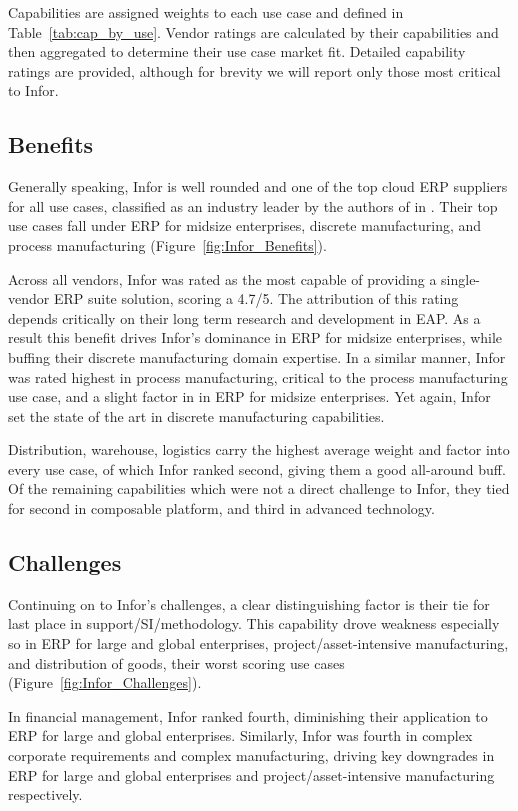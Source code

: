 \documentclass{article}
\begin{document}
Capabilities are assigned weights to each use case and defined in Table~\ref{tab:cap_by_use}.
Vendor ratings are calculated by their capabilities and then aggregated to determine their use case market fit. 
Detailed capability ratings are provided, although for brevity we will report only those most critical to Infor. 

\subsection{Benefits}

Generally speaking, Infor is well rounded and one of the top cloud ERP suppliers for all use cases, classified as an industry leader by the authors of \cite{critical_cloud_erp} in \cite{magic_cloud_erp}.
Their top use cases fall under ERP for midsize enterprises, discrete manufacturing, and process manufacturing (Figure~\ref{fig:Infor_Benefits}).

Across all vendors, Infor was rated as the most capable of providing a single-vendor ERP suite solution, scoring a 4.7/5. 
The attribution of this rating depends critically on their long term research and development in EAP. 
As a result this benefit drives Infor's dominance in ERP for midsize enterprises, while buffing their discrete manufacturing domain expertise. 
In a similar manner, Infor was rated highest in process manufacturing, critical to the process manufacturing use case, and a slight factor in in ERP for midsize enterprises.
Yet again, Infor set the state of the art in discrete manufacturing capabilities.

Distribution, warehouse, logistics carry the highest average weight and factor into every use case, of which Infor ranked second, giving them a good all-around buff. 
Of the remaining capabilities which were not a direct challenge to Infor, they tied for second in composable platform, and third in advanced technology.

\subsection{Challenges}
Continuing on to Infor's challenges, a clear distinguishing factor is their tie for last place in support/SI/methodology. 
This capability drove weakness especially so in ERP for large and global enterprises, project/asset-intensive manufacturing, and distribution of goods, their worst scoring use cases (Figure~\ref{fig:Infor_Challenges}).

In financial management, Infor ranked fourth, diminishing their application to ERP for large and global enterprises.
Similarly, Infor was fourth in complex corporate requirements and complex manufacturing, driving key downgrades in ERP for large and global enterprises and project/asset-intensive manufacturing respectively. 
\end{document}
